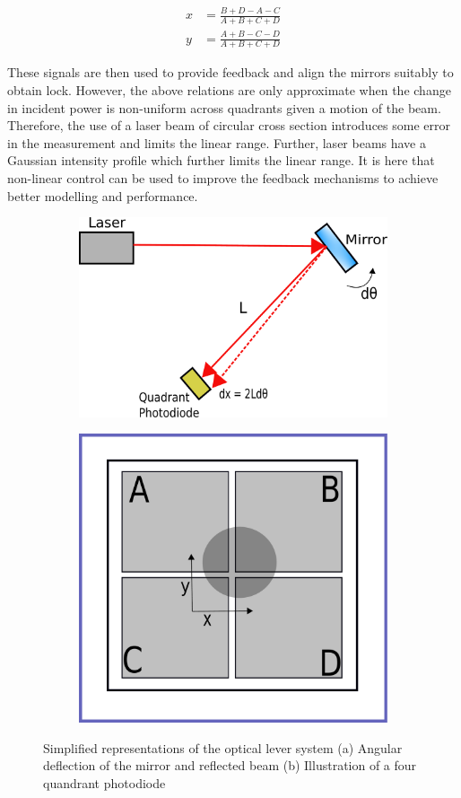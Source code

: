 \documentclass[colorlinks=true,pdfstartview=FitV,linkcolor=blue,
            citecolor=red,urlcolor=magenta]{ligodoc}
\begin{document}
    \begin{align}
    x & = \frac{B + D - A - C}{A + B + C + D} \label{x}\\
    y & = \frac{A + B - C - D}{A + B + C + D} \label{y}
    \end{align}

    These signals are then used to provide feedback and align the mirrors suitably to obtain lock. However, the above relations are only approximate when the change in incident power is non-uniform across quadrants given a motion of the beam. Therefore, the use of a laser beam of circular cross section introduces some error in the measurement and limits the linear range. Further, laser beams have a Gaussian intensity profile which further limits the linear range. It is here that non-linear control can be used to improve the feedback mechanisms to achieve better modelling and performance.


    \begin{figure}[htbp]
      \centering
        \begin{subfigure}[b]{0.4\textwidth}
          \centering
          \includegraphics[width=\linewidth]{figures/2theta.pdf}
          \caption{}
          \label{fig:2theta}
        \end{subfigure}%
        \begin{subfigure}[b]{0.4\textwidth}
          \centering
          \includegraphics[width=0.5\linewidth]{figures/qpd.pdf}
          \caption{}
          \label{fig:qpd}
        \end{subfigure}
      \caption{Simplified representations of the optical lever system (a) Angular deflection of the mirror and reflected beam \cite{control_slides} (b) Illustration of a four quandrant photodiode}
      \label{fig:oplev}
    \end{figure}     
\end{document}
